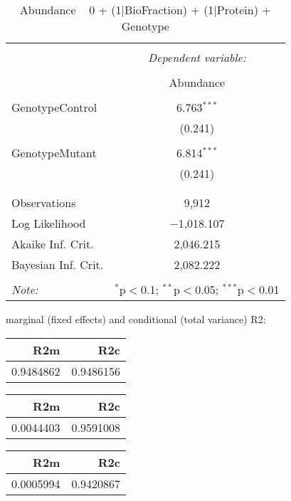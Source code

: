 \documentclass[11pt]{report}
\begin{document}
\begin{table}[!htbp] \centering 
  \caption{Abundance ~ 0 + (1|BioFraction) + (1|Protein) + Genotype} 
  \label{} 
\begin{tabular}{@{\extracolsep{5pt}}lc} 
\\[-1.8ex]\hline 
\hline \\[-1.8ex] 
 & \multicolumn{1}{c}{\textit{Dependent variable:}} \\ 
\cline{2-2} 
\\[-1.8ex] & Abundance \\ 
\hline \\[-1.8ex] 
 GenotypeControl & 6.763$^{***}$ \\ 
  & (0.241) \\ 
  & \\ 
 GenotypeMutant & 6.814$^{***}$ \\ 
  & (0.241) \\ 
  & \\ 
\hline \\[-1.8ex] 
Observations & 9,912 \\ 
Log Likelihood & $-$1,018.107 \\ 
Akaike Inf. Crit. & 2,046.215 \\ 
Bayesian Inf. Crit. & 2,082.222 \\ 
\hline 
\hline \\[-1.8ex] 
\textit{Note:}  & \multicolumn{1}{r}{$^{*}$p$<$0.1; $^{**}$p$<$0.05; $^{***}$p$<$0.01} \\ 
\end{tabular} 
\end{table} 
marginal (fixed effects) and conditional (total variance) R2:

\begin{tabular}{r|r}
\hline
R2m & R2c\\
\hline
0.9484862 & 0.9486156\\
\hline
\end{tabular}

\begin{tabular}{r|r}
\hline
R2m & R2c\\
\hline
0.0044403 & 0.9591008\\
\hline
\end{tabular}

\begin{tabular}{r|r}
\hline
R2m & R2c\\
\hline
0.0005994 & 0.9420867\\
\hline
\end{tabular}
\end{document}
